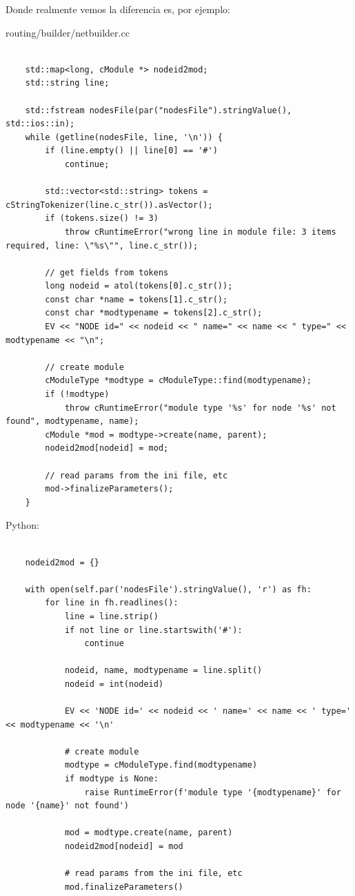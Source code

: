 \documentclass[]{article}
\begin{document}
Donde realmente vemos la diferencia es, por ejemplo:

routing/builder/netbuilder.cc

\begin{verbatim}

    std::map<long, cModule *> nodeid2mod;
    std::string line;

    std::fstream nodesFile(par("nodesFile").stringValue(), std::ios::in);
    while (getline(nodesFile, line, '\n')) {
        if (line.empty() || line[0] == '#')
            continue;

        std::vector<std::string> tokens = cStringTokenizer(line.c_str()).asVector();
        if (tokens.size() != 3)
            throw cRuntimeError("wrong line in module file: 3 items required, line: \"%s\"", line.c_str());

        // get fields from tokens
        long nodeid = atol(tokens[0].c_str());
        const char *name = tokens[1].c_str();
        const char *modtypename = tokens[2].c_str();
        EV << "NODE id=" << nodeid << " name=" << name << " type=" << modtypename << "\n";

        // create module
        cModuleType *modtype = cModuleType::find(modtypename);
        if (!modtype)
            throw cRuntimeError("module type '%s' for node '%s' not found", modtypename, name);
        cModule *mod = modtype->create(name, parent);
        nodeid2mod[nodeid] = mod;

        // read params from the ini file, etc
        mod->finalizeParameters();
    }
\end{verbatim}

Python:

\begin{verbatim}

    nodeid2mod = {}

    with open(self.par('nodesFile').stringValue(), 'r') as fh:
        for line in fh.readlines():
            line = line.strip()
            if not line or line.startswith('#'):
                continue

            nodeid, name, modtypename = line.split()
            nodeid = int(nodeid)

            EV << 'NODE id=' << nodeid << ' name=' << name << ' type=' << modtypename << '\n'

            # create module
            modtype = cModuleType.find(modtypename)
            if modtype is None:
                raise RuntimeError(f'module type '{modtypename}' for node '{name}' not found')

            mod = modtype.create(name, parent)
            nodeid2mod[nodeid] = mod

            # read params from the ini file, etc
            mod.finalizeParameters()

\end{verbatim}
\end{document}
